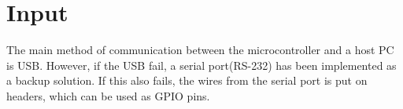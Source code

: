 \documentclass[../main/report.tex]{subfiles}
\begin{document}
\section{Input}

The main method of communication between the microcontroller and a host PC is USB.
However, if the USB fail, a serial port(RS-232) has been implemented as a backup solution.
If this also fails, the wires from the serial port is put on headers, which can be used as GPIO pins.

\end{document}
